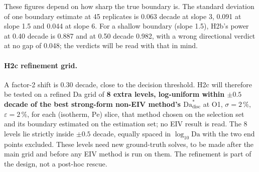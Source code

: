 \documentclass[11pt]{article}
\newcommand{\Da}{\mathrm{Da}}
\newcommand{\Pe}{\mathrm{Pe}}
\begin{document}
These figures depend on how sharp the true boundary is. The standard deviation of one
boundary estimate at 45 replicates is 0.063 decade at slope 3, 0.091 at slope 1.5 and 0.044
at slope 6. For a shallow boundary (slope 1.5), H2b's power at 0.40 decade is 0.887 and at
0.50 decade 0.982, with a wrong directional verdict at no gap of 0.048; the verdicts will be
read with that in mind.

\paragraph{H2c refinement grid.}
A factor-2 shift is 0.30 decade, close to the decision threshold. H2c will therefore be
tested on a refined $\Da$ grid of \textbf{8 extra levels, log-uniform within $\pm 0.5$ decade
of the best strong-form non-EIV method's $\Da^{*}_{\mathrm{disc}}$} at O1, $\sigma = 2\,\%$,
$\varepsilon = 2\,\%$, for each (isotherm, $\Pe$) slice, that method chosen on the selection
set and its boundary estimated on the estimation set; no EIV result is read. The 8 levels
lie strictly inside $\pm 0.5$ decade, equally spaced in
$\log_{10}\Da$ with the two end points excluded. These levels need new ground-truth
solves, to be made after the main grid and before any EIV method is run on them. The
refinement is part of the design, not a post-hoc rescue.
\end{document}
